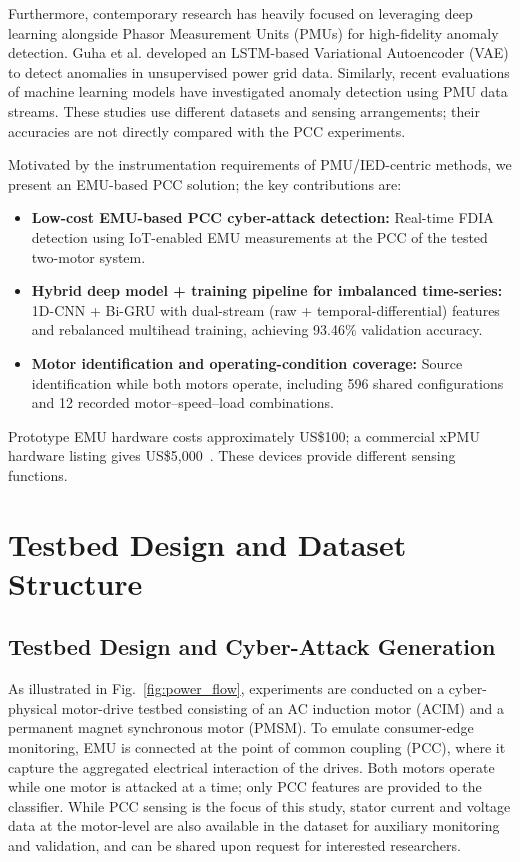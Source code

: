 \documentclass[conference,letterpaper]{IEEEtran}
\begin{document}
Furthermore, contemporary research has heavily focused on leveraging deep learning alongside Phasor Measurement Units (PMUs) for high-fidelity anomaly detection. Guha et al. \cite{guha} developed an LSTM-based Variational Autoencoder (VAE) to detect anomalies in unsupervised power grid data. Similarly, recent evaluations of machine learning models \cite{pmu_lstm_2025} have investigated anomaly detection using PMU data streams. These studies use different datasets and sensing arrangements; their accuracies are not directly compared with the PCC experiments.

Motivated by the instrumentation requirements of PMU/IED-centric methods, we present an EMU-based PCC solution; the key contributions are:
\begin{itemize}
    \item \textbf{Low-cost EMU-based PCC cyber-attack detection:} Real-time FDIA detection using IoT-enabled EMU measurements at the PCC of the tested two-motor system.
    \item \textbf{Hybrid deep model + training pipeline for imbalanced time-series:} 1D-CNN + Bi-GRU with dual-stream (raw + temporal-differential) features and rebalanced multihead training, achieving 93.46\% validation accuracy.
    \item \textbf{Motor identification and operating-condition coverage:} Source identification while both motors operate, including 596 shared configurations and 12 recorded motor--speed--load combinations.
\end{itemize}

Prototype EMU hardware costs approximately US\$100; a commercial xPMU hardware listing gives US\$5,000~\cite{greenens_xpmu_cost}. These devices provide different sensing functions.

\section{Testbed Design and Dataset Structure}

\subsection{Testbed Design and Cyber-Attack Generation}
As illustrated in Fig.~\ref{fig:power_flow}, experiments are conducted on a cyber-physical motor-drive testbed consisting of an AC induction motor (ACIM)  and a permanent magnet synchronous motor (PMSM). To emulate consumer-edge monitoring, EMU is connected at the point of common coupling (PCC), where it capture the aggregated electrical interaction of the drives. Both motors operate while one motor is attacked at a time; only PCC features are provided to the classifier.
While PCC sensing is the focus of this study, stator current and voltage data at the motor-level are also available in the dataset for auxiliary monitoring and validation, and can be shared upon request for interested researchers.
\end{document}
